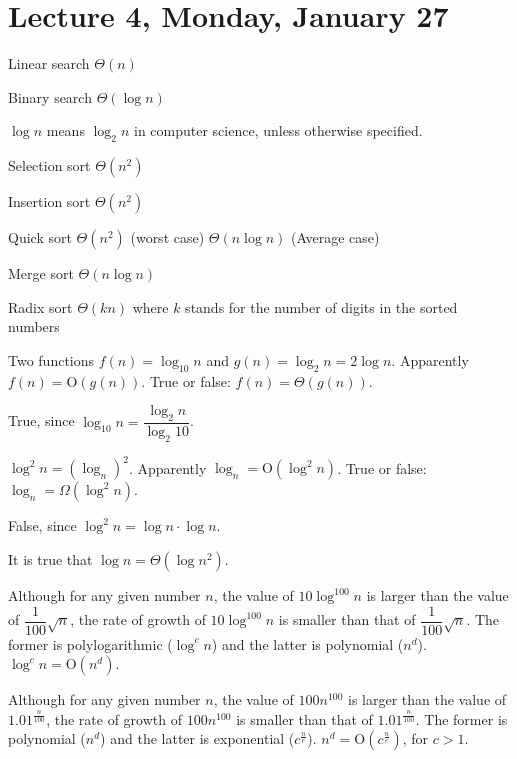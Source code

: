 \section{Lecture 4, Monday, January 27}

Linear search $\Theta(n)$

Binary search $\Theta(\log n)$

\begin{remark}
$\log n$ means $\log_2 n$ in computer science, unless otherwise specified.
\end{remark}

Selection sort $\Theta(n^2)$

Insertion sort $\Theta(n^2)$

Quick sort $\Theta(n^2)$ (worst case) $\Theta(n\log n)$ (Average case)

Merge sort $\Theta(n \log n)$

Radix sort $\Theta(kn)$ where $k$ stands for the number of digits in the sorted numbers

\begin{ex}
Two functions $f(n) = \log_{10} n$ and $g(n) = \log_2 n = 2 \log n$. Apparently $f(n) = \mathrm{O}(g(n))$. True or false: $f(n) = \Theta(g(n))$.

True, since $\log_{10} n = \dfrac{\log_2 n}{\log_2 10}$.
\end{ex}

\begin{ex}
$\log^2 n = (\log_n)^2$. Apparently $\log_n = \mathrm{O}(\log^2 n)$. True or false: $\log_n = \Omega(\log^2 n)$.

False, since $\log^2 n = \log n \cdot \log n$.
\end{ex}

\begin{ex}
It is true that $\log n = \Theta(\log n^2)$.
\end{ex}

\begin{ex}
Although for any given number $n$, the value of $10 \log^{100} n$ is larger than the value of $\dfrac{1}{100} \sqrt{n}$, the rate of growth of $10 \log^{100} n$ is smaller than that of $\dfrac{1}{100} \sqrt{n}$. The former is polylogarithmic ($\log^c n$) and the latter is polynomial ($n^d$). $\log^c n = \mathrm{O} (n^d)$.
\end{ex}

\begin{ex}
Although for any given number $n$, the value of $100 n^100$ is larger than the value of $1.01^{\tfrac{n}{100}}$, the rate of growth of $100 n^100$ is smaller than that of $1.01^{\tfrac{n}{100}}$. The former is polynomial ($n^d$) and the latter is exponential ($c^{\tfrac{n}{e}}$). $n^d = \mathrm{O} (c^{\tfrac{n}{e}})$, for $c > 1$.
\end{ex}

